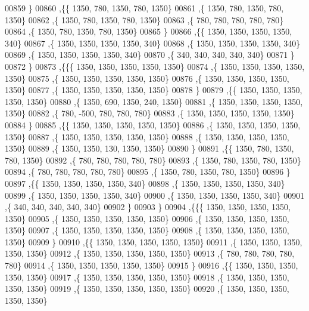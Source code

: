 \begin{DoxyCode}
00859    \}
00860   ,\{\{  1350,   780,  1350,   780,  1350\}
00861    ,\{  1350,   780,  1350,   780,  1350\}
00862    ,\{  1350,   780,  1350,   780,  1350\}
00863    ,\{   780,   780,   780,   780,   780\}
00864    ,\{  1350,   780,  1350,   780,  1350\}
00865    \}
00866   ,\{\{  1350,  1350,  1350,  1350,   340\}
00867    ,\{  1350,  1350,  1350,  1350,   340\}
00868    ,\{  1350,  1350,  1350,  1350,   340\}
00869    ,\{  1350,  1350,  1350,  1350,   340\}
00870    ,\{   340,   340,   340,   340,   340\}
00871    \}
00872   \}
00873  ,\{\{\{  1350,  1350,  1350,  1350,  1350\}
00874    ,\{  1350,  1350,  1350,  1350,  1350\}
00875    ,\{  1350,  1350,  1350,  1350,  1350\}
00876    ,\{  1350,  1350,  1350,  1350,  1350\}
00877    ,\{  1350,  1350,  1350,  1350,  1350\}
00878    \}
00879   ,\{\{  1350,  1350,  1350,  1350,  1350\}
00880    ,\{  1350,   690,  1350,   240,  1350\}
00881    ,\{  1350,  1350,  1350,  1350,  1350\}
00882    ,\{   780,  -500,   780,   780,   780\}
00883    ,\{  1350,  1350,  1350,  1350,  1350\}
00884    \}
00885   ,\{\{  1350,  1350,  1350,  1350,  1350\}
00886    ,\{  1350,  1350,  1350,  1350,  1350\}
00887    ,\{  1350,  1350,  1350,  1350,  1350\}
00888    ,\{  1350,  1350,  1350,  1350,  1350\}
00889    ,\{  1350,  1350,   130,  1350,  1350\}
00890    \}
00891   ,\{\{  1350,   780,  1350,   780,  1350\}
00892    ,\{   780,   780,   780,   780,   780\}
00893    ,\{  1350,   780,  1350,   780,  1350\}
00894    ,\{   780,   780,   780,   780,   780\}
00895    ,\{  1350,   780,  1350,   780,  1350\}
00896    \}
00897   ,\{\{  1350,  1350,  1350,  1350,   340\}
00898    ,\{  1350,  1350,  1350,  1350,   340\}
00899    ,\{  1350,  1350,  1350,  1350,   340\}
00900    ,\{  1350,  1350,  1350,  1350,   340\}
00901    ,\{   340,   340,   340,   340,   340\}
00902    \}
00903   \}
00904  ,\{\{\{  1350,  1350,  1350,  1350,  1350\}
00905    ,\{  1350,  1350,  1350,  1350,  1350\}
00906    ,\{  1350,  1350,  1350,  1350,  1350\}
00907    ,\{  1350,  1350,  1350,  1350,  1350\}
00908    ,\{  1350,  1350,  1350,  1350,  1350\}
00909    \}
00910   ,\{\{  1350,  1350,  1350,  1350,  1350\}
00911    ,\{  1350,  1350,  1350,  1350,  1350\}
00912    ,\{  1350,  1350,  1350,  1350,  1350\}
00913    ,\{   780,   780,   780,   780,   780\}
00914    ,\{  1350,  1350,  1350,  1350,  1350\}
00915    \}
00916   ,\{\{  1350,  1350,  1350,  1350,  1350\}
00917    ,\{  1350,  1350,  1350,  1350,  1350\}
00918    ,\{  1350,  1350,  1350,  1350,  1350\}
00919    ,\{  1350,  1350,  1350,  1350,  1350\}
00920    ,\{  1350,  1350,  1350,  1350,  1350\}

\end{DoxyCode}
